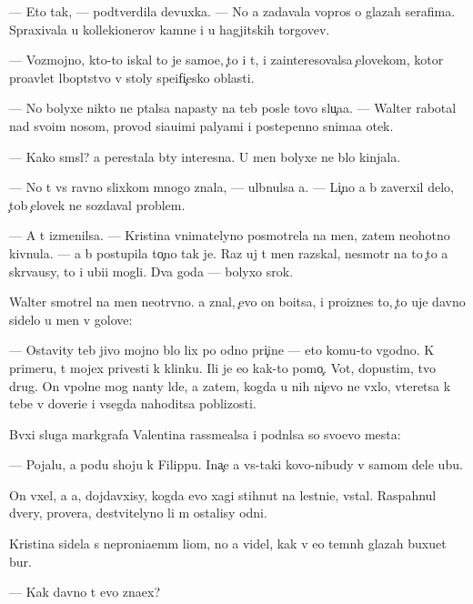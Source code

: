 \documentclass[10pt]{book}
\begin{document}
— Eto tak, — podtverdila devuxka. — No {\y}a zadavala vopros{\yi} o glazah serafima. Spraxivala u kollek{\q}ionerov kamne{\y} i u hagjitskih torgov{\q}ev.

— Vozmojno, kto-to iskal to je samo{\y}e, {\c}to i t{\yi}, i zainteresovalsa {\c}elovekom, kotor{\yi}{\y} pro{\y}avl{\ia}{\y}et l{\iu}bop{\yi}tstvo v stoly spe{\q}ifi{\c}esko{\y} oblasti.

— No bolyxe nikto ne p{\yi}talsa napasty na teb{\ia} posle tovo slu{\c}a{\y}a. — Walter rabotal nad svo{\y}im nosom, provod{\ia} si{\y}a{\y}u{\x}imi paly{\q}ami i postepenno snima{\y}a otek.

— Kako{\y} sm{\yi}sl? {\Y}a perestala b{\yi}ty interesna. U men{\ia} bolyxe ne b{\yi}lo kinjala.

— No t{\yi} vs{\e} ravno slixkom mnogo znala, — ul{\yi}bnulsa {\y}a. — Li{\c}no {\y}a b{\yi} zaverxil delo, {\c}tob{\yi} {\c}elovek ne sozdaval problem{\yi}.

— A t{\yi} izmenilsa. — Kristina vnimatelyno posmotrela na men{\ia}, zatem neohotno kivnula. — {\Y}a b{\yi} postupila to{\c}no tak je. Raz uj t{\yi} men{\ia} raz{\yi}skal, nesmotr{\ia} na to {\c}to {\y}a skr{\yi}va{\y}usy, to i ubi{\y}{\q}i mogli. Dva goda — bolyxo{\y} srok.

Walter smotrel na men{\ia} neotr{\yi}vno. {\Y}a znal, {\c}evo on bo{\y}itsa, i proiznes to, {\c}to uje davno sidelo u men{\ia} v golove:

— Ostavity teb{\ia} jivo{\y} mojno b{\yi}lo lix po odno{\y} pri{\c}ine — eto komu-to v{\yi}godno. K primeru, t{\yi} mojex privesti k klinku. Ili je {\y}e{\x}o kak-to pomo{\c}. Vot, dopustim, tvo{\y} drug. On vpolne mog nan{\ia}ty l{\iu}de{\y}, a zatem, kogda u nih ni{\c}evo ne v{\yi}xlo, vteretsa k tebe v doveri{\y}e i vsegda nahoditsa poblizosti.

B{\yi}vxi{\y} sluga markgrafa Valentina rassme{\y}alsa i podn{\ia}lsa so svo{\y}evo mesta:

— Pojalu{\y}, {\y}a po{\y}du shoju k Filippu. Ina{\c}e {\y}a vs{\e}-taki kovo-nibudy v samom dele ub{\y}u.

On v{\yi}xel, a {\y}a, dojdavxisy, kogda {\y}evo xagi stihnut na lestni{\q}e, vstal. Raspahnul dvery, prover{\ia}{\y}a, de{\y}stvitelyno li m{\yi} ostalisy odni.

Kristina sidela s neproni{\q}a{\y}em{\yi}m li{\q}om, no {\y}a videl, kak v {\y}e{\y}o temn{\yi}h glazah buxu{\y}et bur{\ia}.

— Kak davno t{\yi} {\y}evo zna{\y}ex?
\end{document}
